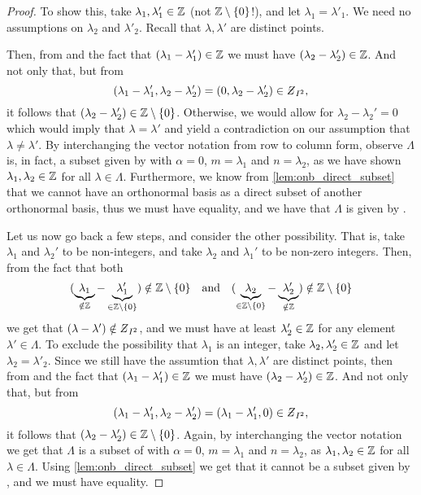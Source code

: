 \documentclass[../thesis.tex]{subfiles}
\begin{document}
\begin{proof}
    To show this, take $\lambda_1,\lambda'_1 \in \mathbb{Z}$ (not $\mathbb{Z}\setminus\{0\}$!), and let $\lambda_1 = \lambda'_1$. We need no assumptions on $\lambda_2$ and $\lambda'_2$. Recall that $\lambda,\lambda'$ are distinct points. 
    
    Then, from  and the fact that $(\lambda_1-\lambda'_1)\in \mathbb{Z}$ we must have $(\lambda_2-\lambda_2') \in \mathbb{Z}$. And not only that, but from
    \begin{equation*}
        \brac{\lambda_1-\lambda'_1,\lambda_2-\lambda'_2} = \brac{0,\lambda_2-\lambda'_2}\in \Zstroke_{I^2},
    \end{equation*}
    it follows that $(\lambda_2- \lambda_2') \in \mathbb{Z}\setminus\{0\}$. Otherwise, we would allow for $\lambda_2-\lambda_2'=0$ which would imply that $\lambda=\lambda'$ and yield a contradiction on our assumption that $\lambda\neq\lambda'$. 
    By interchanging the vector notation from row to column form, observe $\Lambda$ is, in fact, a subset given by  with $\alpha = 0$, $m = \lambda_1$ and $n = \lambda_2$, as we have shown $\lambda_1, \lambda_2 \in \mathbb{Z}$ for all $\lambda \in \Lambda$. Furthermore, we know from \cref{lem:onb_direct_subset} that we cannot have an orthonormal basis as a direct subset of another orthonormal basis, thus we must have equality, and we have that $\Lambda$ is given by .

    Let us now go back a few steps, and consider the other possibility. That is, take $\lambda_1$ and $\lambda_2'$ to be non-integers, and take $\lambda_2$ and $\lambda_1'$ to be non-zero integers. Then, from the fact that both 
    \begin{align*}
        (\underbrace{\lambda_1}_{\notin \mathbb{Z}}-\underbrace{\lambda_1'}_{\in \mathbb{Z}\setminus\{0\}}) \notin \mathbb{Z}\setminus\{0\}
        \quad \text{and} \quad
        (\underbrace{\lambda_2}_{\in \mathbb{Z}\setminus\{0\}}-\underbrace{\lambda_2'}_{\notin \mathbb{Z}}) \notin \mathbb{Z}\setminus\{0\}
    \end{align*}
    we get that $\brac{\lambda-\lambda'} \notin \Zstroke_{I^2}$, and we must have at least $\lambda_2'\in \mathbb{Z}$ for any element $\lambda'\in \Lambda$. To exclude the possibility that $\lambda_1$ is an integer, take $\lambda_2,\lambda'_2 \in \mathbb{Z}$ and let $\lambda_2 = \lambda'_2$. Since we still have the assumtion that $\lambda, \lambda'$ are distinct points, then from  and the fact that $(\lambda_1-\lambda'_1)\in \mathbb{Z}$ we must have $(\lambda_2-\lambda_2') \in \mathbb{Z}$. And not only that, but from
    \begin{equation*}
        \brac{\lambda_1-\lambda'_1,\lambda_2-\lambda'_2} = \brac{\lambda_1-\lambda'_1,0}\in \Zstroke_{I^2},
    \end{equation*}
    it follows that $(\lambda_2- \lambda_2') \in \mathbb{Z}\setminus\{0\}$. Again, by interchanging the vector notation we get that $\Lambda$ is a subset of  with $\alpha = 0$, $m = \lambda_1$ and $n = \lambda_2$, as $\lambda_1, \lambda_2 \in \mathbb{Z}$ for all $\lambda \in \Lambda$. Using \cref{lem:onb_direct_subset} we get that it cannot be a subset given by , and we must have equality.


\end{proof}
\end{document}
